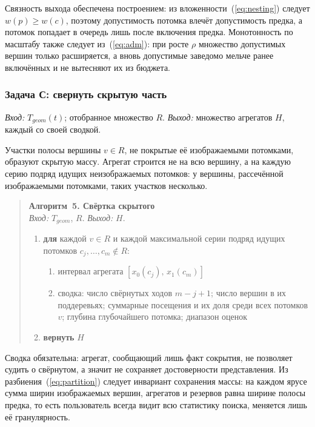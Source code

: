 Связность выхода обеспечена построением: из вложенности~(\ref{eq:nesting})
следует $w(p) \ge w(c)$, поэтому допустимость потомка влечёт допустимость
предка, а потомок попадает в очередь лишь после включения предка.
Монотонность по масштабу также следует из~(\ref{eq:adm}): при росте $\rho$
множество допустимых вершин только расширяется, а вновь допустимые заведомо
мельче ранее включённых и не вытесняют их из бюджета.

\subsubsection{Задача С: свернуть скрытую часть}

\emph{Вход:} $T_{geom}(t)$; отобранное множество $R$.
\emph{Выход:} множество агрегатов $H$, каждый со своей сводкой.

Участки полосы вершины $v \in R$, не покрытые её изображаемыми потомками,
образуют скрытую массу. Агрегат строится не на всю вершину, а на каждую
серию подряд идущих неизображаемых потомков: у вершины, рассечённой
изображаемыми потомками, таких участков несколько.

\begin{quote}
\textbf{Алгоритм~5. Свёртка скрытого}\\
\emph{Вход:} $T_{geom}$, $R$. \emph{Выход:} $H$.
\begin{enumerate}
  \item \textbf{для} каждой $v \in R$ и каждой максимальной серии подряд
        идущих потомков $c_j, \dots, c_m \notin R$:
  \begin{enumerate}
    \item интервал агрегата $[x_0(c_j),\, x_1(c_m)]$
    \item сводка: число свёрнутых ходов $m - j + 1$; число вершин в их
          поддеревьях; суммарные посещения и их доля среди всех потомков
          $v$; глубина глубочайшего потомка; диапазон оценок
  \end{enumerate}
  \item \textbf{вернуть} $H$
\end{enumerate}
\end{quote}

Сводка обязательна: агрегат, сообщающий лишь факт сокрытия, не позволяет
судить о свёрнутом, а значит не сохраняет достоверности представления. Из
разбиения~(\ref{eq:partition}) следует инвариант сохранения массы: на
каждом ярусе сумма ширин изображаемых вершин, агрегатов и резервов равна
ширине полосы предка, то есть пользователь всегда видит всю статистику
поиска, меняется лишь её гранулярность.

